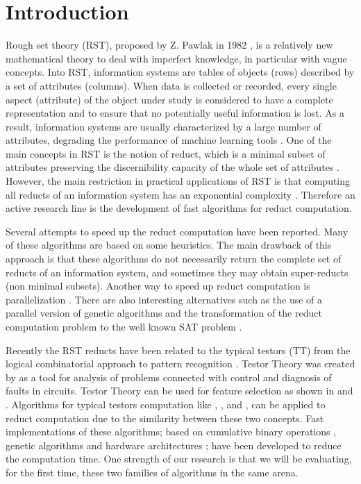 \documentclass[authoryear,11pt]{elsarticle}
\begin{document}
\section{Introduction}
  Rough set theory (RST), proposed by Z. Pawlak in 1982 \citep{Pawlak81,Pawlak81-2,Pawlak82,Pawlak91}, 
  is a relatively new mathematical theory to deal with imperfect knowledge, in particular with vague 
  concepts. Into RST, information systems are tables of objects (rows) described by a set of attributes (columns). 
  When data is collected or recorded, every single aspect (attribute) of the object under study is considered 
  to have a complete representation and to ensure that no potentially useful information is lost.
  As a result, information systems are usually characterized by a large number of attributes,
  degrading the performance of machine learning tools \citep{Parthalain08}.
  One of the main concepts in RST is the notion of reduct, which is a minimal subset of attributes 
  preserving the discernibility capacity of the whole set of attributes \citep{Pawlak91}. 
  However, the main restriction in practical applications of RST is that computing all reducts of an information 
  system has an exponential complexity \citep{Skowron92}. Therefore an active research line is the development 
  of fast algorithms for reduct computation.
  
  Several attempts to speed up the reduct computation have been reported. Many of these algorithms are 
  based on some heuristics. The main drawback of this approach is that these algorithms do not necessarily 
  return the complete set of reducts of an information system, and sometimes they may obtain super-reducts 
  (non minimal subsets). 
  Another way to speed up reduct computation is parallelization \citep{Strakowski08}. There are also 
  interesting alternatives such as the use of a parallel version of genetic algorithms \citep{Wroblewski98}
  and the transformation of the reduct computation problem to the well known SAT problem \citep{Jensen14}.
  
  Recently the RST reducts have been related to the typical testors (TT) from the logical combinatorial approach 
  to pattern recognition \citep{Lazo15}. Testor Theory was created by \cite{Cheguis55} as a tool for analysis of 
  problems connected with control and diagnosis of faults in circuits. 
  Testor Theory can be used for feature selection as shown in \citep{Ruiz08} and \citep{Martinez01}. Algorithms for
  typical testors computation like \citep{Ruiz85}, \citep{Santiesteban03}, \citep{Sanchez07} 
  and \citep{Lias09}, can be applied to reduct computation due to the similarity between these two concepts. 
  Fast implementations of these algorithms; based on cumulative binary operations \citep{Sanchez10}, genetic 
  algorithms \citep{Sanchez99} and hardware architectures \citep{Rojas12}; have been developed to reduce the
  computation time. One strength of our research is that we will be evaluating, for the first time, these two 
  families of algorithms in the same arena.
     
\end{document}

